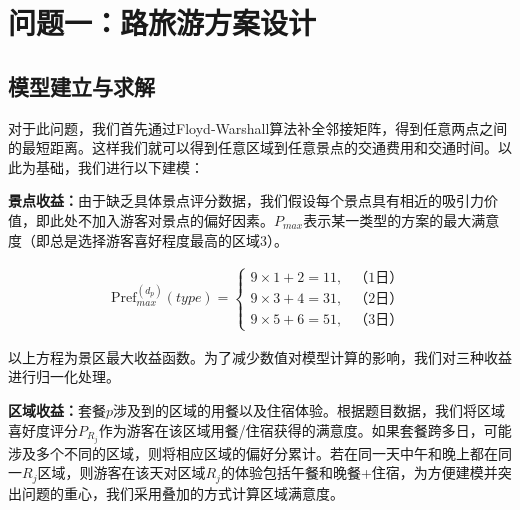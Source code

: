 

\section[\hspace{-2pt}问题一：路旅游方案设计]{{\heiti{} \hspace{-8pt}问题一：路旅游方案设计}}\label{section3: 问题1：路旅游方案设计}

\subsection[\hspace{-2pt}模型建立与求解]{{\heiti{} \hspace{-8pt}模型建立与求解}}\label{section3: 模型建立与求解}

对于此问题，我们首先通过Floyd‑Warshall算法补全邻接矩阵，得到任意两点之间的最短距离。这样我们就可以得到任意区域到任意景点的交通费用和交通时间。以此为基础，我们进行以下建模：

\textbf{景点收益：}由于缺乏具体景点评分数据，我们假设每个景点具有相近的吸引力价值，即此处不加入游客对景点的偏好因素。$P_{max}$表示某一类型的方案的最大满意度（即总是选择游客喜好程度最高的区域3）。

\begin{equation}
  \begin{aligned}
  \text{Pref}^{(d_{p})}_{max}(type)=\begin{cases}
  9\times 1+2=11, & \text{（1日）}\\
  9\times 3+4=31, & \text{（2日）}\\
  9\times 5+6=51, & \text{（3日）}
  \end{cases}
  \end{aligned}
  \end{equation}

以上方程为景区最大收益函数。为了减少数值对模型计算的影响，我们对三种收益进行归一化处理。

\textbf{区域收益：}套餐$p$涉及到的区域的用餐以及住宿体验。根据题目数据，我们将区域喜好度评分$P_{R_{j}}$作为游客在该区域用餐/住宿获得的满意度。如果套餐跨多日，可能涉及多个不同的区域，则将相应区域的偏好分累计。若在同一天中午和晚上都在同一$R_{j}$区域，则游客在该天对区域$R_{j}$的体验包括午餐和晚餐+住宿，为方便建模并突出问题的重心，我们采用叠加的方式计算区域满意度。

